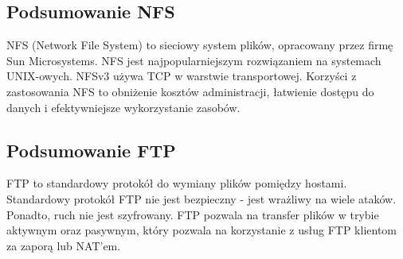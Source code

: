 \documentclass[a4paper,11pt]{article}
\begin{document}
\subsection{Podsumowanie NFS}
NFS (Network File System) to sieciowy system plików, opracowany przez firmę Sun Microsystems. NFS jest najpopularniejszym rozwiązaniem na systemach UNIX-owych. NFSv3 używa TCP w warstwie transportowej. Korzyści z zastosowania NFS to obniżenie kosztów administracji, łatwienie dostępu do danych i efektywniejsze wykorzystanie zasobów.


\subsection{Podsumowanie FTP}
FTP to standardowy protokół do wymiany plików pomiędzy hostami. Standardowy protokół FTP nie jest bezpieczny - jest wrażliwy na wiele ataków. Ponadto, ruch nie jest szyfrowany. FTP pozwala na transfer plików w trybie aktywnym oraz pasywnym, który pozwala na korzystanie z usług FTP klientom za zaporą lub NAT'em.
\end{document}
